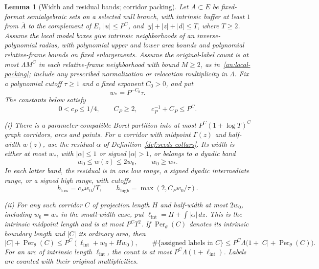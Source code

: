 \documentclass[11pt]{amsart}
\newtheorem{lemma}[theorem]{Lemma}
\theoremstyle{definition}
\theoremstyle{remark}
\numberwithin{equation}{section}
\begin{document}
\begin{lemma}[Width and residual bands; corridor packing]\label{geo:bands-packing}
Let \(A\subset E\) be fixed-format semialgebraic sets on a selected null branch, with intrinsic buffer at least \(1\) from \(\overline A\) to the complement of \(E\), \(|u|\le P^C\), and \(|y|+|z|+|d|\le T\), where \(T\ge2\). Assume the local model boxes give intrinsic neighborhoods of an inverse-polynomial radius, with polynomial upper and lower area bounds and polynomial relative-frame bounds on fixed enlargements. Assume the original-label count is at most \(\Lambda M^C\) in each relative-frame neighborhood with bound \(M\ge2\), as in~\eqref{an:local-packing}; include any prescribed normalization or relocation multiplicity in \(\Lambda\). Fix a polynomial cutoff \(\tau\ge1\) and a fixed exponent \(C_0>0\), and put
\[
w_*=P^{-C_0}\tau.
\]
The constants below satisfy
\[
0<c_P\le1/4,\qquad C_P\ge2,\qquad c_P^{-1}+C_P\le P^C.
\]

\noindent\textup{(i)} There is a parameter-compatible Borel partition into at most \(P^C(1+\log T)^C\) graph corridors, arcs and points. For a corridor with midpoint \(\Gamma(z)\) and half-width \(w(z)\), use the residual \(\alpha\) of Definition~\ref{def:seeds-collars}. Its width is either at most \(w_*\), with \(|\alpha|\le1\) or signed \(|\alpha|>1\), or belongs to a dyadic band
\[
w_0\le w(z)\le2w_0,\qquad w_0\ge w_*.
\]
In each latter band, the residual is in one low range, a signed dyadic intermediate range, or a signed high range, with cutoffs
\[
h_{\mathrm{low}}=c_Pw_0/T,\qquad h_{\mathrm{high}}=\max(2,C_Pw_0/\tau).
\]

\noindent\textup{(ii)} For any such corridor \(C\) of projection length \(H\) and half-width at most \(2w_0\), including \(w_0=w_*\) in the small-width case, put \(\ell_{\mathrm{int}}=H+\int|\alpha|\,dz\). This is the intrinsic midpoint length and is at most \(P^CT^2\). If \(\operatorname{Per}_{\theta}(C)\) denotes its intrinsic boundary length and \(|C|\) its ordinary area, then
\[
|C|+\operatorname{Per}_{\theta}(C)\le P^C(\ell_{\mathrm{int}}+w_0+Hw_0),\qquad
\#\{\text{assigned labels in }C\}\le P^C\Lambda\bigl(1+|C|+\operatorname{Per}_{\theta}(C)\bigr).
\]
For an arc of intrinsic length \(\ell_{\mathrm{int}}\), the count is at most \(P^C\Lambda(1+\ell_{\mathrm{int}})\). Labels are counted with their original multiplicities.
\end{lemma}
\end{document}
